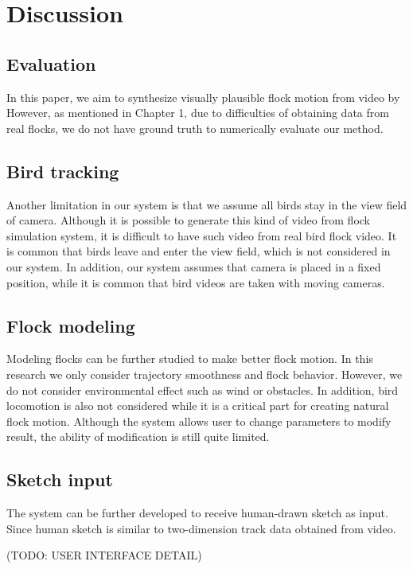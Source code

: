 \chapter{Discussion}


\section{Evaluation}


In this paper, we aim to synthesize visually plausible flock motion from video by However, as mentioned in Chapter 1, due to difficulties of obtaining data from real flocks, we do not have ground truth to numerically evaluate our method.


\section{Bird tracking}


Another limitation in our system is that we assume all birds stay in the view field of camera. Although it is possible to generate this kind of video from flock simulation system, it is difficult to have such video from real bird flock video. It is common that birds leave and enter the view field, which is not considered in our system. In addition, our system assumes that camera is placed in a fixed position, while it is common that bird videos are taken with moving cameras.


\section{Flock modeling}


Modeling flocks can be further studied to make better flock motion. In this research we only consider trajectory smoothness and flock behavior. However, we do not consider environmental effect such as wind or obstacles. In addition, bird locomotion is also not considered while it is a critical part for creating natural flock motion. 
Although the system allows user to change parameters to modify result, the ability of modification is still quite limited. 


\section{Sketch input}


The system can be further developed to receive human-drawn sketch as input. Since human sketch is similar to two-dimension track data obtained from video.


(TODO: USER INTERFACE DETAIL)
